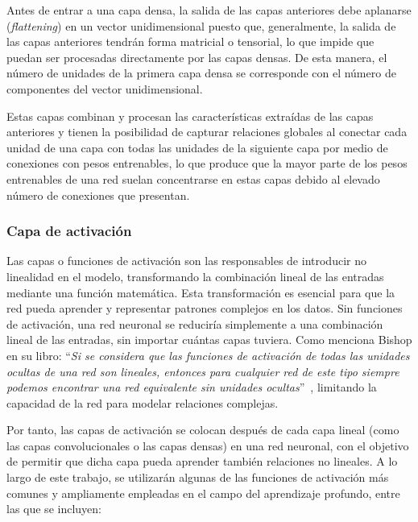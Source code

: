 Antes de entrar a una capa densa, la salida de las capas anteriores debe aplanarse (\emph{flattening}) en un vector unidimensional puesto que, generalmente, la salida de las capas anteriores tendrán forma matricial o tensorial, lo que impide que puedan ser procesadas directamente por las capas densas. De esta manera, el número de unidades de la primera capa densa se corresponde con el número de componentes del vector unidimensional.

Estas capas combinan y procesan las características extraídas de las capas anteriores y tienen la posibilidad de capturar relaciones globales al conectar cada unidad de una capa con todas las unidades de la siguiente capa por medio de conexiones con pesos entrenables, lo que produce que la mayor parte de los pesos entrenables de una red suelan concentrarse en estas capas debido al elevado número de conexiones que presentan.

\subsubsection{Capa de activación}\label{subsubsec:capa-de-activacion}

Las capas o funciones de activación son las responsables de introducir no linealidad en el modelo, transformando la combinación lineal de las entradas mediante una función matemática. Esta transformación es esencial para que la red pueda aprender y representar patrones complejos en los datos. Sin funciones de activación, una red neuronal se reduciría simplemente a una combinación lineal de las entradas, sin importar cuántas capas tuviera. Como menciona Bishop en su libro: ``\textit{Si se considera que las funciones de activación de todas las unidades ocultas de una red son lineales, entonces para cualquier red de este tipo siempre podemos encontrar una red equivalente sin unidades ocultas}''~\cite{Bishop2006}, limitando la capacidad de la red para modelar relaciones complejas.

Por tanto, las capas de activación se colocan después de cada capa lineal (como las capas convolucionales o las capas densas) en una red neuronal, con el objetivo de permitir que dicha capa pueda aprender también relaciones no lineales. A lo largo de este trabajo, se utilizarán algunas de las funciones de activación más comunes y ampliamente empleadas en el campo del aprendizaje profundo, entre las que se incluyen:

